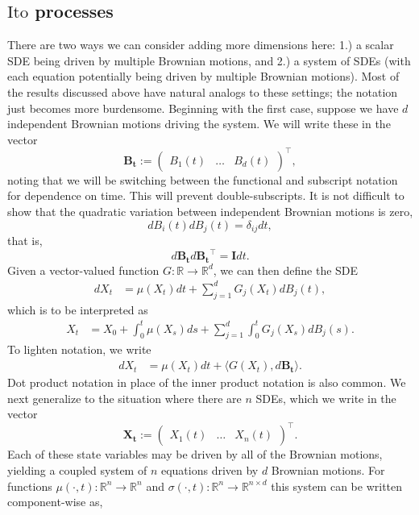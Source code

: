 \documentclass[12pt]{article}
\newcommand{\B}[1]{\boldsymbol{#1}}
\newcommand{\R}{\mathbb{R}}
\newcommand{\state}[1][t]{X_{#1}}
\newcommand{\BM}[1][t]{B_{#1}} %
\newcommand{\ito}{\text{It}\hat{\text{o}}}
\newcommand{\dimBM}{d} %
\newcommand{\dimState}{n}
\begin{document}
\subsection{$\ito$ processes}
There are two ways we can consider adding more dimensions here: 1.) a scalar SDE being driven by multiple Brownian motions, and 
2.) a system of SDEs (with each equation potentially being driven by multiple Brownian motions). Most of the results discussed above have 
natural analogs to these settings; the notation just becomes more burdensome. Beginning with the first case, suppose we have 
$\dimBM$ independent Brownian motions driving the system. We will write these in the vector 
\[
\B\BM := \begin{pmatrix} \BM[1](t) & \dots & \BM[\dimBM](t) \end{pmatrix}^\top,
\]
noting that we will be switching between the functional and subscript notation for dependence on time. This will prevent double-subscripts. 
It is not difficult to  show that the quadratic variation between independent Brownian motions is zero, 
\[
d\BM[i](t) d\BM[j](t) = \delta_{ij} dt,
\]
that is, 
\[
d\B\BM d\B\BM^\top = \B{I} dt.
\]
Given a vector-valued function $G: \R \to \R^{\dimBM}$, we can then define the SDE
\begin{align*}
d\state &= \mu(\state) dt + \sum_{j=1}^{\dimBM} G_j(\state) d\BM[j](t), 
\end{align*}
which is to be interpreted as 
\begin{align*}
\state &= \state[0] + \int_{0}^{t} \mu(\state[s]) ds + \sum_{j=1}^{\dimBM} \int_{0}^{t} G_j(\state[s]) d\BM[j](s).
\end{align*}
To lighten notation, we write 
\begin{align*}
d\state &= \mu(\state) dt + \langle G(\state), d\B\BM \rangle.
\end{align*}
Dot product notation in place of the inner product notation is also common. We next generalize to the situation where there are $\dimState$ 
SDEs, which we write in the vector
\[
\B\state := \begin{pmatrix} \state[1](t) & \dots & \state[\dimState](t) \end{pmatrix}^\top.
\]
Each of these state variables may be driven by all of the Brownian motions, yielding a coupled system of $\dimState$ equations
driven by $\dimBM$ Brownian motions. For functions $\mu(\cdot, t): \R^{\dimState} \to \R^{\dimState}$ and $\sigma(\cdot, t): \R^{\dimState} \to \R^{\dimState \times \dimBM}$ this
 system can be written component-wise as,
\end{document}
